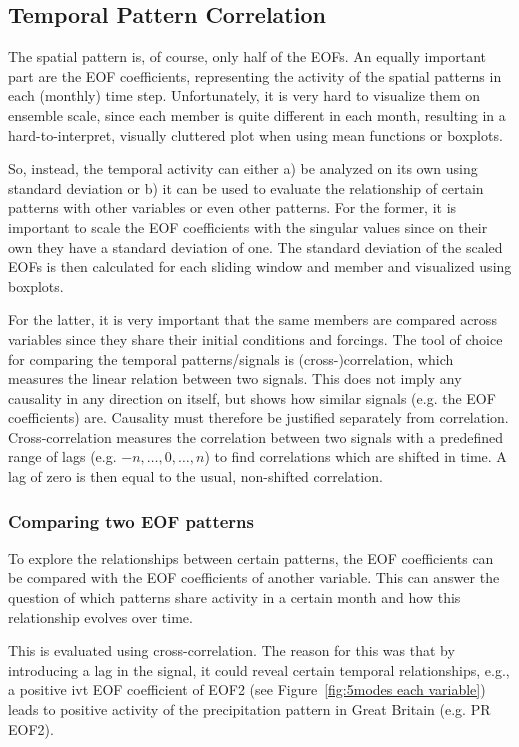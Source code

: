 \subsection{Temporal Pattern Correlation} %
\label{sec:Temporal Pattern Correlation}

The spatial pattern is, of course, only half of the EOFs. 
An equally important part are the EOF coefficients, representing the activity of the spatial patterns in each (monthly) time step. 
Unfortunately, it is very hard to visualize them on ensemble scale, since each member is quite different in each month, resulting in a hard-to-interpret, visually cluttered plot when using mean functions or boxplots. 

So, instead, the temporal activity can either a) be analyzed on its own using standard deviation or b) it can be used to evaluate the relationship of certain patterns with other variables or even other patterns. 
For the former, it is important to scale the EOF coefficients with the singular values since on their own they have a standard deviation of one. 
The standard deviation of the scaled EOFs is then calculated for each sliding window and member and visualized using boxplots. 

For the latter, it is very important that the same members are compared across variables since they share their initial conditions and forcings.  
The tool of choice for comparing the temporal patterns/signals is (cross-)correlation, which measures the linear relation between two signals.
This does not imply any causality in any direction on itself, but shows how similar signals (e.g. the EOF coefficients) are. 
Causality must therefore be justified separately from correlation.  
Cross-correlation measures the correlation between two signals with a predefined range of lags (e.g. $-n,\dots,0,\dots,n$) to find correlations which are shifted in time. 
A lag of zero is then equal to the usual, non-shifted correlation. 

\subsubsection{Comparing two EOF patterns}

To explore the relationships between certain patterns, the EOF coefficients can be compared with the EOF coefficients of another variable. 
This can answer the question of which patterns share activity in a certain month and how this relationship evolves over time. 

This is evaluated using cross-correlation. 
The reason for this was that by introducing a lag in the signal, it could reveal certain temporal relationships, e.g., a positive \ac{ivt} EOF coefficient of EOF2 (see Figure~\ref{fig:5modes each variable}) leads to positive activity of the precipitation pattern in Great Britain (e.g. PR EOF2). 

